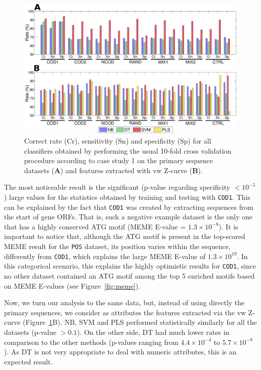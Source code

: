 \documentclass[conference,letterpaper]{IEEEtran}
\begin{document}
\begin{figure}
\vspace{0.0cm}
    \centering
    \includegraphics[width=1.0\textwidth]{Figs/Fig.pdf}
    \caption{Correct rate (Cr), sensitivity (Sn) and specificity (Sp) for all classifiers obtained by performing the usual 10-fold cross validation procedure according to case study 1 on the primary sequence datasets ({\bf A}) and features extracted with vw Z-curve ({\bf B}). }
    \label{fig:barplot}
\end{figure}

The most noticeable result is the significant (p-value regarding specificity $< 10^{-5} $) large values for the statistics obtained by training and testing with {\tt COD1}. This can be explained by the fact that {\tt COD1} was created by extracting sequences from the start of gene ORFs. That is, such a negative example dataset is the only one that has a highly conserved ATG motif (MEME E-value = $1.3\times10^{-8}$). It is important to notice that, although the ATG motif is present in the top-scored MEME result for the {\tt POS} dataset, its position varies within the sequence, differently from {\tt COD1}, which explains the large MEME E-value of $1.3\times10^{19}$. In this categorical scenario, this explains the highly optimistic results for {\tt COD1}, since no other dataset contained an ATG motif among the top 5 enriched motifs based on MEME E-values (see Figure~\ref{fig:meme}).

Now, we turn our analysis to the same data, but, instead of using directly the primary sequences, we consider as attributes the features extracted via the vw Z-curve (Figure~\ref{fig:barplot}B). NB, SVM and PLS performed statistically similarly for all the datasets (p-value $> 0.1$). On the other side, DT had much lower rates in comparison to the other methods (p-values ranging from $4.4\times10^{-4}$ to $5.7\times10^{-8}$). As DT is not very appropriate to deal with numeric attributes, this is an expected result. 
\end{document}
